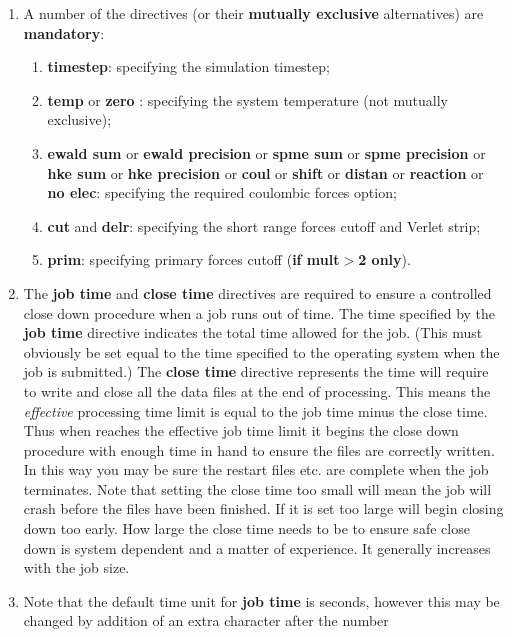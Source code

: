 \begin{enumerate}
\item A number of the directives (or their {\bf mutually exclusive}
      alternatives) are {\bf mandatory}:
\begin{enumerate}
\item {\bf timestep}: specifying the simulation timestep;
\item {\bf temp} or {\bf zero} : specifying the system temperature
       (not mutually exclusive);
\item {\bf ewald sum} or {\bf ewald precision}
       or {\bf spme sum} or {\bf spme precision}
       or {\bf hke sum} or {\bf hke precision}
       or {\bf coul} or {\bf shift} 
       or {\bf distan} or {\bf reaction} 
       or {\bf no elec}: specifying the required coulombic forces
option;
\item {\bf cut} and {\bf delr}: specifying the short range forces
      cutoff and Verlet strip;
\item {\bf prim}: specifying primary forces cutoff ({\bf if mult$>$2
only}).
\end{enumerate}
\item The {\bf job time} and {\bf close time} directives are required
      to ensure a controlled close down procedure when a job runs out
      of time. The time specified by the {\bf job time} directive
      indicates the total time allowed for the job. (This must
      obviously be set equal to the time specified to the operating
      system when the job is submitted.) The {\bf close time}
      directive represents the time \D{} will require to write and close
      all the data files at the end of processing. This means the {\em
      effective} processing time limit is equal to the job time minus
      the close time. Thus when \D{} reaches the effective job time
      limit it begins the close down procedure with enough time in
      hand to ensure the files are correctly written. In this way you
      may be sure the restart files etc. are complete when the job
      terminates. Note that setting the close time too small will mean
      the job will crash before the files have been finished. If it is
      set too large \D{} will begin closing down too early.  How large
      the close time needs to be to ensure safe close down is system
      dependent and a matter of experience. It generally increases
      with the job size.
\item Note that the default time unit for {\bf job time} is seconds, however
      this may be changed by addition of an extra character after the number

\end{enumerate}
